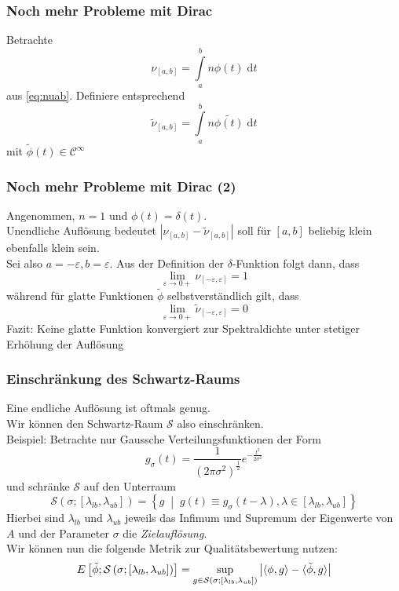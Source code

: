 \documentclass{beamer}
\newcommand{\dt}{\;\mathrm{d}t}
\newcommand{\Cinfty}{\mathcal{C}^{\infty}}
\newcommand{\SR}{\mathcal{S}}
\renewcommand{\mid}{\;\middle|\;}
\begin{document}
\begin{frame}
    \frametitle{Noch mehr Probleme mit Dirac}
    Betrachte
    $$\nu_{[a, b]} = \int\limits_a^b n \phi(t) \dt$$
    aus \eqref{eq:nuab}. Definiere entsprechend
    $$\tilde{\nu}_{[a, b]} = \int\limits_a^b n \tilde{\phi(t)} \dt$$
    mit $\tilde{\phi}(t) \in \Cinfty$
\end{frame}

\begin{frame}
    \frametitle{Noch mehr Probleme mit Dirac (2)}
    Angenommen, $n = 1$ und $\phi(t) = \delta(t)$.\\
    Unendliche Auflösung bedeutet $\left| \nu_{[a, b]} - \tilde{\nu}_{[a, b]} \right|$ soll für $[a ,b]$ beliebig klein ebenfalls klein sein.\\
    Sei also $a = -\varepsilon, b = \varepsilon$. Aus der Definition der $\delta$-Funktion folgt dann, dass
    $$\lim \limits_{\varepsilon \to 0+} \nu_{[-\varepsilon, \varepsilon]} = 1$$
    während für glatte Funktionen $\tilde{\phi}$ selbstverständlich gilt, dass
    $$\lim \limits_{\varepsilon \to 0+} \tilde{\nu}_{[-\varepsilon, \varepsilon]} = 0$$
    Fazit: Keine glatte Funktion konvergiert zur Spektraldichte unter stetiger Erhöhung der Auflösung
\end{frame}

\begin{frame}
    \frametitle{Einschränkung des Schwartz-Raums}
    Eine endliche Auflösung ist oftmals genug.\\
    Wir können den Schwartz-Raum $\SR$ also einschränken.\\
    Beispiel: Betrachte nur Gaussche Verteilungsfunktionen der Form
    $$g_{\sigma}(t) = \frac{1}{(2\pi\sigma^2)^\frac{1}{2}}e^{-\frac{t^2}{2\sigma^2}}$$
    und schränke $\SR$ auf den Unterraum
    $$\SR(\sigma;[\lambda_{lb}, \lambda_{ub}]) = \left\{ g \mid g(t) \equiv g_{\sigma}(t - \lambda), \lambda \in [\lambda_{lb}, \lambda_{ub}] \right\}$$
    Hierbei sind $\lambda_{lb}$ und $\lambda_{ub}$ jeweils das Infimum und Supremum der Eigenwerte von $A$ und der Parameter $\sigma$ die \emph{Zielauflösung}.\\
    Wir können nun die folgende Metrik zur Qualitätsbewertung nutzen:
    \begin{equation} \label{eq:error}
        E\left[\tilde{\phi};\SR\left(\sigma; \left[\lambda_{lb}, \lambda_{ub} \right] \right)\right] = \sup_{g \in \SR(\sigma;[\lambda_{lb}, \lambda_{ub}])} \left| \langle \phi, g \rangle - \langle \tilde{\phi}, g \rangle \right|$$
    \end{equation}
\end{frame}
\end{document}

